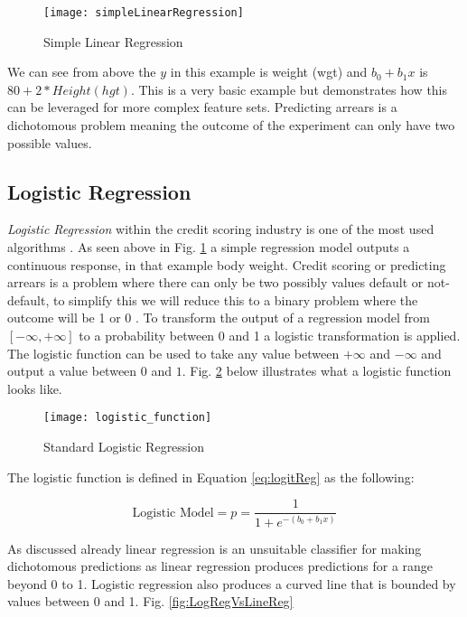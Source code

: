 \begin{figure}[H]
	\texttt{[image: simpleLinearRegression]}
	\caption[Confusion Matrix]
	{Simple Linear Regression}
	\label{fig:simpleLinearRegression}
\end{figure}

We can see from above the $y$ in this example is weight (wgt) and $b_0 + b_1x$ is $80 + 2*Height(hgt)$. This is a very basic example but demonstrates how this can be leveraged for more complex feature sets. Predicting arrears is a dichotomous problem meaning the outcome of the experiment can only have two possible values. 

\subsection{Logistic Regression} \label{LogReg}
\textit{Logistic Regression} \cite[See:][]{hosmer_applied_2000} within the credit scoring industry is one of the most used algorithms \citep{hand_evaluating_2010}. As seen above in Fig. \ref{fig:simpleLinearRegression} a simple regression model outputs a continuous response, in that example body weight. Credit scoring or predicting arrears is a problem where there can only be two possibly values default or not-default, to simplify this we will reduce this to a binary problem where the outcome will be 1 or 0 \citep{zou_modified_2004}. To transform the output of a regression model from $[-\infty, +\infty]$ to a probability between 0 and 1 a logistic transformation is applied. The logistic function can be used to take any value between $+\infty$ and $-\infty$ and output a value between $0$ and $1$. Fig. \ref{fig:logistic_function} below illustrates what a logistic function looks like.


\begin{figure}[H]
	\texttt{[image: logistic\_function]}
	\caption[Standard Logistic Regression]
	{Standard Logistic Regression}
	\label{fig:logistic_function}
\end{figure}

The logistic function is defined in Equation \ref{eq:logitReg} as the following: 

\begin{equation} \label{eq:logitReg}
\text{Logistic Model}  =  p  =  \frac{1}{1 + e^{-(b_0 + b_1x)}}
\end{equation}

As discussed already linear regression is an unsuitable classifier for making dichotomous predictions as linear regression produces predictions for a range beyond 0 to 1. Logistic regression also produces a curved line that is bounded by values between 0 and 1. Fig. \ref{fig:LogRegVsLineReg}

